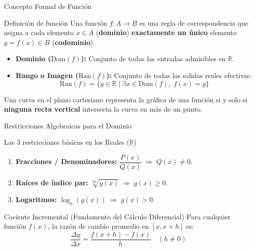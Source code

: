 \documentclass[aspectratio=169]{beamer}
\begin{document}
\begin{frame}{Concepto Formal de Función}
  \begin{block}{Definición de función}
    Una función $f: A \to B$ es una regla de correspondencia que asigna a cada elemento $x \in A$ (\textbf{dominio}) \textbf{exactamente un único} elemento $y = f(x) \in B$ (\textbf{codominio}).
    \begin{itemize}
      \item \textbf{Dominio ($\text{Dom}(f)$):} Conjunto de todas las entradas admisibles en $\mathbb{R}$.
      \item \textbf{Rango o Imagen ($\text{Ran}(f)$):} Conjunto de todas las salidas reales efectivas:
            $$\text{Ran}(f) = \{y \in \mathbb{R} \mid \exists x \in \text{Dom}(f), \; f(x) = y\}$$
    \end{itemize}
  \end{block}

  \vspace{4pt}
  \begin{mwextra}
    Una curva en el plano cartesiano representa la gráfica de una función si y solo si \textbf{ninguna recta vertical} intersecta la curva en más de un punto.
  \end{mwextra}
\end{frame}

\begin{frame}{Restricciones Algebraicas para el Dominio}
  \begin{alertblock}{Las 3 restricciones básicas en los Reales ($\mathbb{R}$)}
    \begin{enumerate}
      \item \textbf{Fracciones / Denominadores:} $\dfrac{P(x)}{Q(x)} \;\Longrightarrow\; Q(x) \neq 0$.
      \item \textbf{Raíces de índice par:} $\sqrt[2n]{g(x)} \;\Longrightarrow\; g(x) \ge 0$.
      \item \textbf{Logaritmos:} $\log_a(g(x)) \;\Longrightarrow\; g(x) > 0$.
    \end{enumerate}
  \end{alertblock}

  \vspace{4pt}
  \begin{block}{Cociente Incremental (Fundamento del Cálculo Diferencial)}
    Para cualquier función $f(x)$, la razón de cambio promedio en $[x, x+h]$ es:
    $$\frac{\Delta y}{\Delta x} = \frac{f(x + h) - f(x)}{h} \quad (h \neq 0)$$
  \end{block}
\end{frame}
\end{document}

